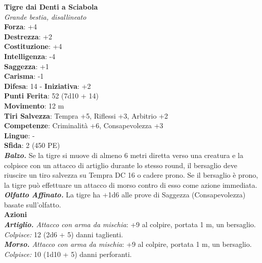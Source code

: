 \begin{multicols}{2}
\medskip\textbf{Tigre dai Denti a Sciabola}\\
\emph{Grande bestia, disallineato}\\
\textbf{Forza}: +4\\
\textbf{Destrezza}: +2\\
\textbf{Costituzione}: +4\\
\textbf{Intelligenza}: -4\\
\textbf{Saggezza}: +1\\
\textbf{Carisma}: -1\\
\textbf{Difesa}: 14 - \textbf{Iniziativa}: +2\\
\textbf{Punti Ferita}: 52 (7d10 + 14)\\
\textbf{Movimento}: 12 m\\
\textbf{Tiri Salvezza}: Tempra +5, Riflessi +3, Arbitrio +2\\
\textbf{Competenze}: Criminalità +6, Consapevolezza +3\\
\textbf{Lingue}: -\\
\textbf{Sfida}: 2 (450 PE)\smallskip\\
\emph{\textbf{Balzo.}} Se la tigre si muove di almeno 6 metri diretta verso una creatura e la colpisce con un attacco di artiglio durante lo stesso round, il bersaglio deve riuscire un tiro salvezza su Tempra DC  16 o cadere prono. Se il bersaglio è prono, la tigre può effettuare un attacco di morso contro di esso come azione immediata.\\
\emph{\textbf{Olfatto Affinato.}} La tigre ha +1d6 alle prove di Saggezza (Consapevolezza) basate sull'olfatto.\\
\smallskip\textbf{Azioni}\\
\emph{\textbf{Artiglio.} Attacco con arma da mischia}: +9 al colpire, portata 1 m, un bersaglio.\\
\emph{Colpisce:} 12 (2d6 + 5) danni taglienti.\\
\emph{\textbf{Morso.} Attacco con arma da mischia}: +9 al colpire, portata 1 m, un bersaglio.\\
\emph{Colpisce:} 10 (1d10 + 5) danni perforanti.\\


\end{multicols}
